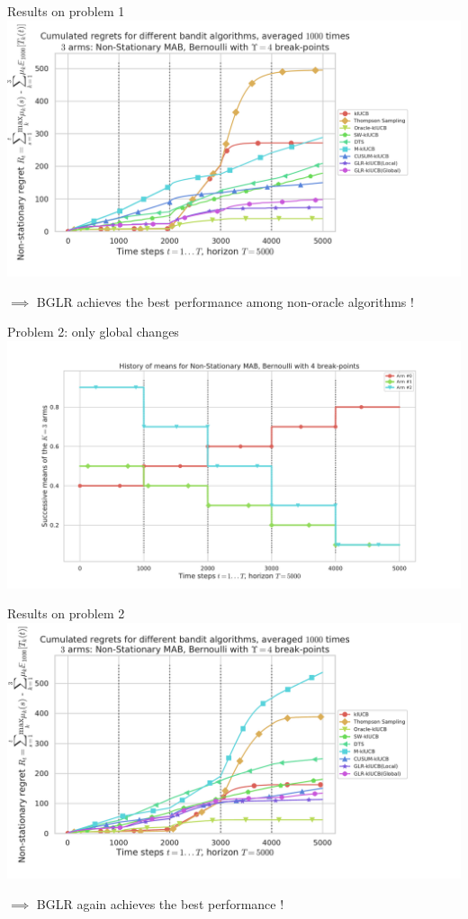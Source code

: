 \documentclass[11pt,english,ignorenonframetext,]{beamer}
\begin{document}
\begin{frame}[plain]{Results on problem 1}
  \centering
  \includegraphics[width=1.05\textwidth]{figures/regret_problem1.png}

  $\implies$ BGLR achieves the best performance among non-oracle algorithms \dCooley{} !
\end{frame}


\begin{frame}[plain]{Problem 2: only global changes}
  \centering
  \includegraphics[width=1.00\textwidth]{figures/Problem_2.pdf}
\end{frame}

\begin{frame}[plain]{Results on problem 2}
  \centering
  \includegraphics[width=1.05\textwidth]{figures/regret_problem2.pdf}

  $\implies$ BGLR again achieves the best performance \dCooley{} !
\end{frame}
\end{document}

